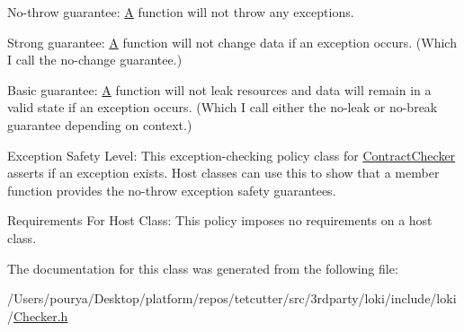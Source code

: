 \begin{DoxyItemize}
\item No-\/throw guarantee\+: \hyperlink{structA}{A} function will not throw any exceptions.
\item Strong guarantee\+: \hyperlink{structA}{A} function will not change data if an exception occurs. (Which I call the no-\/change guarantee.)
\item Basic guarantee\+: \hyperlink{structA}{A} function will not leak resources and data will remain in a valid state if an exception occurs. (Which I call either the no-\/leak or no-\/break guarantee depending on context.)
\end{DoxyItemize}

\begin{DoxyParagraph}{Exception Safety Level\+:}
This exception-\/checking policy class for \hyperlink{classLoki_1_1ContractChecker}{Contract\+Checker} asserts if an exception exists. Host classes can use this to show that a member function provides the no-\/throw exception safety guarantees.
\end{DoxyParagraph}
\begin{DoxyParagraph}{Requirements For Host Class\+:}
This policy imposes no requirements on a host class. 
\end{DoxyParagraph}


The documentation for this class was generated from the following file\+:\begin{DoxyCompactItemize}
\item 
/\+Users/pourya/\+Desktop/platform/repos/tetcutter/src/3rdparty/loki/include/loki/\hyperlink{Checker_8h}{Checker.\+h}\end{DoxyCompactItemize}

